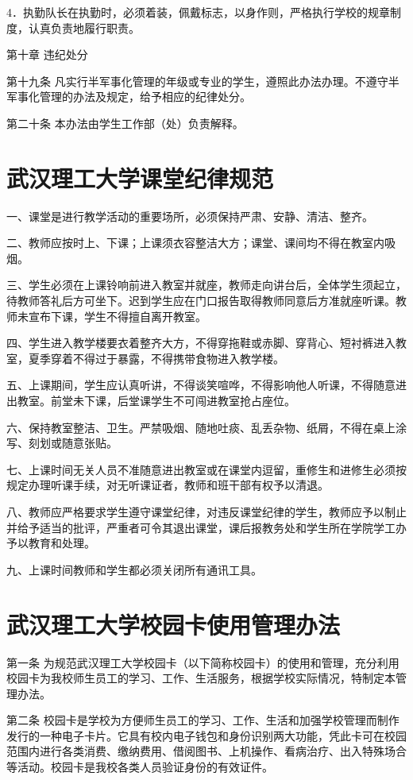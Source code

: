 \documentclass[UTF8,12pt,a4paper]{report}
\begin{document}
4．执勤队长在执勤时，必须着装，佩戴标志，以身作则，严格执行学校的规章制度，认真负责地履行职责。

第十章 违纪处分

第十九条 凡实行半军事化管理的年级或专业的学生，遵照此办法办理。不遵守半军事化管理的办法及规定，给予相应的纪律处分。

第二十条 本办法由学生工作部（处）负责解释。

\chapter{武汉理工大学课堂纪律规范}
一、课堂是进行教学活动的重要场所，必须保持严肃、安静、清洁、整齐。

二、教师应按时上、下课；上课须衣容整洁大方；课堂、课间均不得在教室内吸烟。

三、学生必须在上课铃响前进入教室并就座，教师走向讲台后，全体学生须起立，待教师答礼后方可坐下。迟到学生应在门口报告取得教师同意后方准就座听课。教师未宣布下课，学生不得擅自离开教室。

四、学生进入教学楼要衣着整齐大方，不得穿拖鞋或赤脚、穿背心、短衬裤进入教室，夏季穿着不得过于暴露，不得携带食物进入教学楼。

五、上课期间，学生应认真听讲，不得谈笑喧哗，不得影响他人听课，不得随意进出教室。前堂未下课，后堂课学生不可闯进教室抢占座位。

六、保持教室整洁、卫生。严禁吸烟、随地吐痰、乱丢杂物、纸屑，不得在桌上涂写、刻划或随意张贴。

七、上课时间无关人员不准随意进出教室或在课堂内逗留，重修生和进修生必须按规定办理听课手续，对无听课证者，教师和班干部有权予以清退。

八、教师应严格要求学生遵守课堂纪律，对违反课堂纪律的学生，教师应予以制止并给予适当的批评，严重者可令其退出课堂，课后报教务处和学生所在学院学工办予以教育和处理。

九、上课时间教师和学生都必须关闭所有通讯工具。

\chapter{武汉理工大学校园卡使用管理办法}
第一条 为规范武汉理工大学校园卡（以下简称校园卡）的使用和管理，充分利用校园卡为我校师生员工的学习、工作、生活服务，根据学校实际情况，特制定本管理办法。

第二条 校园卡是学校为方便师生员工的学习、工作、生活和加强学校管理而制作发行的一种电子卡片。它具有校内电子钱包和身份识别两大功能，凭此卡可在校园范围内进行各类消费、缴纳费用、借阅图书、上机操作、看病治疗、出入特殊场合等活动。校园卡是我校各类人员验证身份的有效证件。
\end{document}
